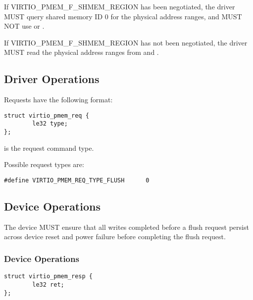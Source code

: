 
If VIRTIO_PMEM_F_SHMEM_REGION has been negotiated, the driver MUST query
shared memory ID 0 for the physical address ranges, and MUST NOT use
 or .

If VIRTIO_PMEM_F_SHMEM_REGION has not been negotiated, the driver MUST read the
physical address ranges from  and .

\subsection{Driver Operations}\label{sec:Device Types / PMEM Driver / Driver Operation / Request Queues}

Requests have the following format:

\begin{lstlisting}
struct virtio_pmem_req {
        le32 type;
};
\end{lstlisting}

 is the request command type.

Possible request types are:

\begin{lstlisting}
#define VIRTIO_PMEM_REQ_TYPE_FLUSH      0
\end{lstlisting}

\subsection{Device Operations}\label{sec:Device Types / PMEM Driver / Device Operation}

The device MUST ensure that all writes completed before a flush request persist across device reset and power failure before completing the flush request.

\subsubsection{Device Operations}\label{sec:Device Types / PMEM Driver / Device Operation / Virtqueue return}
\begin{lstlisting}
struct virtio_pmem_resp {
        le32 ret;
};
\end{lstlisting}

